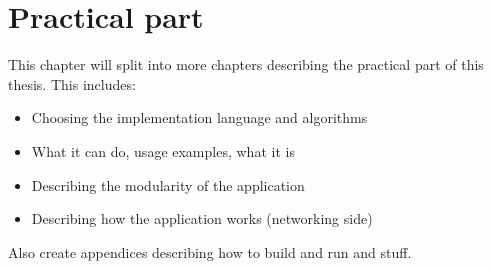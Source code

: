 \chapter{Practical part}

This chapter will split into more chapters describing the practical part of this thesis. This includes:

\begin{itemize}
  \item Choosing the implementation language and algorithms
  \item What it can do, usage examples, what it is
  \item Describing the modularity of the application
  \item Describing how the application works (networking side)
\end{itemize}


\noindent Also create appendices describing how to build and run and stuff.